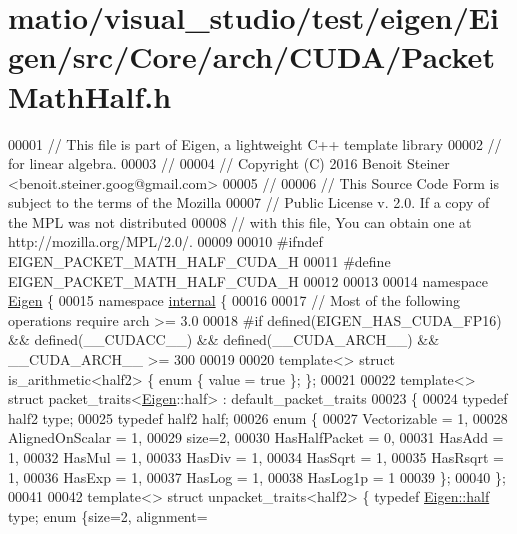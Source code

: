 \hypertarget{matio_2visual__studio_2test_2eigen_2_eigen_2src_2_core_2arch_2_c_u_d_a_2_packet_math_half_8h_source}{}\section{matio/visual\+\_\+studio/test/eigen/\+Eigen/src/\+Core/arch/\+C\+U\+D\+A/\+Packet\+Math\+Half.h}
\label{matio_2visual__studio_2test_2eigen_2_eigen_2src_2_core_2arch_2_c_u_d_a_2_packet_math_half_8h_source}

\begin{DoxyCode}
00001 \textcolor{comment}{// This file is part of Eigen, a lightweight C++ template library}
00002 \textcolor{comment}{// for linear algebra.}
00003 \textcolor{comment}{//}
00004 \textcolor{comment}{// Copyright (C) 2016 Benoit Steiner <benoit.steiner.goog@gmail.com>}
00005 \textcolor{comment}{//}
00006 \textcolor{comment}{// This Source Code Form is subject to the terms of the Mozilla}
00007 \textcolor{comment}{// Public License v. 2.0. If a copy of the MPL was not distributed}
00008 \textcolor{comment}{// with this file, You can obtain one at http://mozilla.org/MPL/2.0/.}
00009 
00010 \textcolor{preprocessor}{#ifndef EIGEN\_PACKET\_MATH\_HALF\_CUDA\_H}
00011 \textcolor{preprocessor}{#define EIGEN\_PACKET\_MATH\_HALF\_CUDA\_H}
00012 
00013 
00014 \textcolor{keyword}{namespace }\hyperlink{namespace_eigen}{Eigen} \{
00015 \textcolor{keyword}{namespace }\hyperlink{namespaceinternal}{internal} \{
00016 
00017 \textcolor{comment}{// Most of the following operations require arch >= 3.0}
00018 \textcolor{preprocessor}{#if defined(EIGEN\_HAS\_CUDA\_FP16) && defined(\_\_CUDACC\_\_) && defined(\_\_CUDA\_ARCH\_\_) && \_\_CUDA\_ARCH\_\_ >= 300}
00019 
00020 \textcolor{keyword}{template}<> \textcolor{keyword}{struct }is\_arithmetic<half2> \{ \textcolor{keyword}{enum} \{ value = \textcolor{keyword}{true} \}; \};
00021 
00022 \textcolor{keyword}{template}<> \textcolor{keyword}{struct }packet\_traits<\hyperlink{namespace_eigen}{Eigen}::half> : default\_packet\_traits
00023 \{
00024   \textcolor{keyword}{typedef} half2 type;
00025   \textcolor{keyword}{typedef} half2 half;
00026   \textcolor{keyword}{enum} \{
00027     Vectorizable = 1,
00028     AlignedOnScalar = 1,
00029     size=2,
00030     HasHalfPacket = 0,
00031     HasAdd    = 1,
00032     HasMul    = 1,
00033     HasDiv    = 1,
00034     HasSqrt   = 1,
00035     HasRsqrt  = 1,
00036     HasExp    = 1,
00037     HasLog    = 1,
00038     HasLog1p  = 1
00039   \};
00040 \};
00041 
00042 \textcolor{keyword}{template}<> \textcolor{keyword}{struct }unpacket\_traits<half2> \{ \textcolor{keyword}{typedef} \hyperlink{struct_eigen_1_1half}{Eigen::half} type; \textcolor{keyword}{enum} \{size=2, alignment=

\end{DoxyCode}
